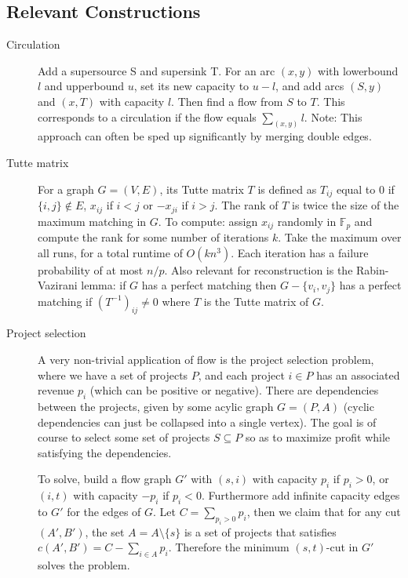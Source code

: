 \documentclass[
	a4paper,
	landscape,
	10pt,
	article
]{article}
\begin{document}
\subsection{Relevant Constructions}
\begin{description}
	\item[Circulation] Add a supersource S and supersink T. For an arc
		$(x, y)$ with lowerbound $l$ and upperbound $u$, set its new
		capacity to $u-l$, and add arcs $(S, y)$ and $(x, T)$ with capacity
		$l$. Then find a flow from $S$ to $T$. This corresponds to a
		circulation if the flow equals $\sum_{(x, y)} l$. Note: This approach
		can often be sped up significantly by merging double edges.
	\item[Tutte matrix] For a graph $G = (V, E)$, its Tutte matrix $T$ is
		defined as $T_{ij}$ equal to $0$ if $\{i, j\}\not\in E$, $x_{ij}$
		if $i < j$ or $-x_{ji}$ if $i > j$. The rank of $T$ is twice the size
		of the maximum matching in $G$. To compute: assign $x_{ij}$ randomly
		in $\mathbb{F}_p$ and compute the rank for some number of iterations $k$.
		Take the maximum over all runs, for a total runtime of $O(kn^3)$. Each
		iteration has a failure probability of at most $n / p$. Also
		relevant for reconstruction is the Rabin-Vazirani lemma: if $G$ has a
		perfect matching then $G - \{v_i, v_j\}$ has a perfect matching if
		$(T^{-1})_{ij} \neq 0$ where $T$ is the Tutte matrix of $G$.
	\item[Project selection] A very non-trivial application of flow is the
		project selection problem, where we have a set of projects $P$, and
		each project $i\in P$ has an associated revenue $p_i$ (which can be
		positive or negative). There are dependencies between the projects,
		given by some acylic graph $G=(P, A)$ (cyclic dependencies can just
		be collapsed into a single vertex). The goal is of course to select 
		some set of projects $S \subseteq P$ so as to maximize
		profit while satisfying the dependencies.

		To solve, build a flow graph $G'$ with $(s, i)$ with capacity $p_i$
		if $p_i > 0$, or $(i, t)$ with capacity $-p_i$ if $p_i<0$. Furthermore
		add infinite capacity edges to $G'$ for the edges of $G$. Let
		$C = \sum_{p_i > 0} p_i$, then we claim that for any cut $(A', B')$,
		the set $A = A\setminus\{s\}$ is a set of projects that satisfies
		$c(A', B') = C - \sum_{i\in A} p_i$. Therefore the minimum $(s, t)$-cut
		in $G'$ solves the problem.
\end{description}
\end{document}
